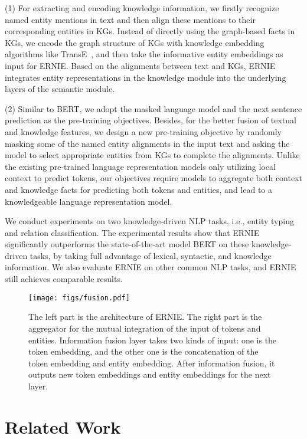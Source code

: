 \documentclass[11pt,a4paper]{article}
\begin{document}
(1) For extracting and encoding knowledge information, we firstly recognize named entity mentions in text and then align these mentions to their corresponding entities in KGs. Instead of directly using the graph-based facts in KGs, we encode the graph structure of KGs with knowledge embedding algorithms like TransE~\cite{bordes2013translating}, and then take the informative entity embeddings as input for ERNIE. Based on the alignments between text and KGs, ERNIE integrates entity representations in the knowledge module into the underlying layers of the semantic module.



(2) Similar to BERT, we adopt the masked language model and the next sentence prediction as the pre-training objectives. Besides, for the better fusion of textual and knowledge features, we design a new pre-training objective by randomly masking some of the named entity alignments in the input text and asking the model to select appropriate entities from KGs to complete the alignments. Unlike the existing pre-trained language representation models only utilizing local context to predict tokens, our objectives require models to aggregate both context and knowledge facts for predicting both tokens and entities, and lead to a knowledgeable language representation model.



We conduct experiments on two knowledge-driven NLP tasks, i.e., entity typing and relation classification. The experimental results show that ERNIE significantly outperforms the state-of-the-art model BERT on these knowledge-driven tasks, by taking full advantage of lexical, syntactic, and knowledge information. We also evaluate ERNIE on other common NLP tasks, and ERNIE still achieves comparable results. 


\begin{figure*}[t]
\centering
\texttt{[image: figs/fusion.pdf]}
\caption{The left part is the architecture of ERNIE. The right part is the aggregator for the mutual integration of the input of tokens and entities. 
Information fusion layer takes two kinds of input: one is the token embedding, and the other one is the concatenation of the token embedding and entity embedding. After information fusion, it outputs new token embeddings and entity embeddings for the next layer.}
\label{fig:fusion}
\end{figure*}



\section{Related Work}
\end{document}
